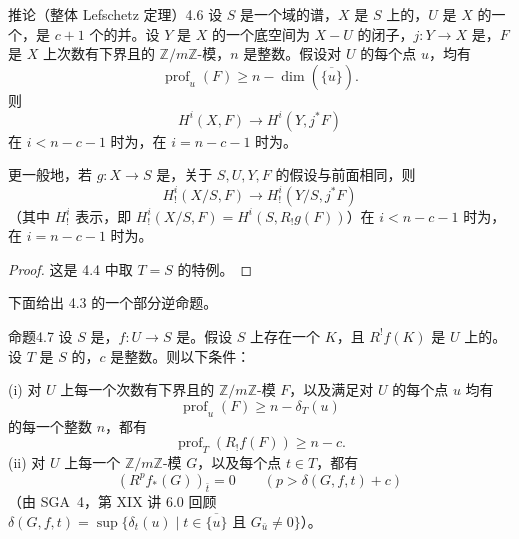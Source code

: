 \begin{SGAresult}{推论（整体 Lefschetz 定理）}{4.6}
设 $S$ 是一个域的谱，$X$ 是 $S$ 上的，$U$ 是 $X$ 的一个，是 $c+1$ 个的并。设 $Y$ 是 $X$ 的一个底空间为 $X-U$ 的闭子，$j:Y\to X$ 是，$F$ 是 $X$ 上次数有下界且的 $\mathbb Z/m\mathbb Z$-模，$n$ 是整数。假设对 $U$ 的每个点 $u$，均有
\[
\operatorname{prof}_u(F)\geq n-\dim(\overline{\{u\}}).
\]
则
\[
H^i(X,F)\longrightarrow H^i(Y,j^*F)
\]
在 $i<n-c-1$ 时为，在 $i=n-c-1$ 时为。

更一般地，若 $g:X\to S$ 是，关于 $S,U,Y,F$ 的假设与前面相同，则
\[
H^i_!(X/S,F)\longrightarrow H^i_!(Y/S,j^*F)
\]
（其中 $H^i_!$ 表示，即 $H^i_!(X/S,F)=H^i(S,R_!g(F))$）在 $i<n-c-1$ 时为，在 $i=n-c-1$ 时为。
\end{SGAresult}
\begin{proof}
这是 4.4 中取 $T=S$ 的特例。
\end{proof}
下面给出 4.3 的一个部分逆命题。
\begin{SGAresult}{命题}{4.7}
设 $S$ 是，$f:U\to S$ 是。假设 $S$ 上存在一个 $K$，且 $R^!f(K)$ 是 $U$ 上的。设 $T$ 是 $S$ 的，$c$ 是整数。则以下条件：

(i) 对 $U$ 上每一个次数有下界且的 $\mathbb Z/m\mathbb Z$-模 $F$，以及满足对 $U$ 的每个点 $u$ 均有
\[
\operatorname{prof}_u(F)\geq n-\delta_T(u)
\]
的每一个整数 $n$，都有
\[
\operatorname{prof}_T(R_!f(F))\geq n-c.
\]
(ii) 对 $U$ 上每一个 $\mathbb Z/m\mathbb Z$-模 $G$，以及每个点 $t\in T$，都有
\[
(R^pf_*(G))_{\bar t}=0\qquad(p>\delta(G,f,t)+c)
\]
（由 SGA~4，第 XIX 讲 6.0 回顾 $\delta(G,f,t)=\sup\{\delta_t(u)\mid t\in\overline{\{u\}}\text{ 且 }G_{\bar u}\ne0\}$）。
\end{SGAresult}
